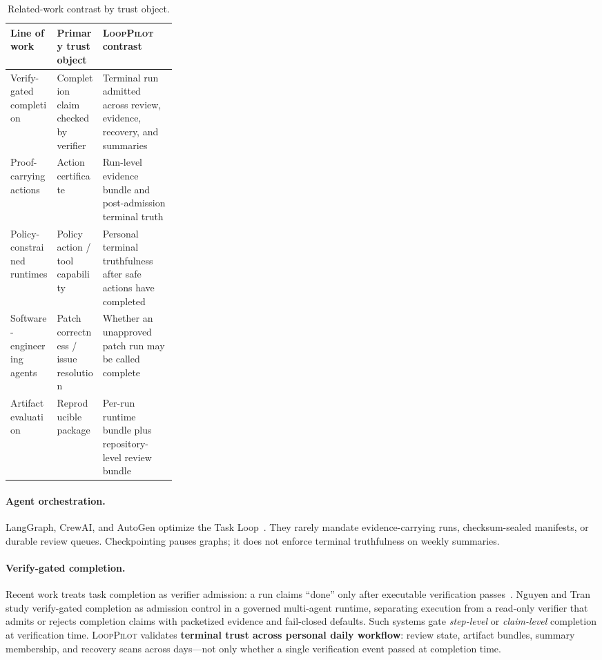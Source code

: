 \documentclass[11pt]{article}
\newcommand{\looppilot}{\textsc{LoopPilot}}
\begin{document}
\begin{table}[t]
  \centering
  \caption{Related-work contrast by trust object.}
  \label{tab:related-trust-objects}
  \small
  \begin{tabularx}{\linewidth}{@{}p{0.28\linewidth} X X@{}}
    \toprule
    \textbf{Line of work} & \textbf{Primary trust object} & \textbf{\looppilot{} contrast} \\
    \midrule
    Verify-gated completion & Completion claim checked by verifier & Terminal run admitted across review, evidence, recovery, and summaries \\
    Proof-carrying actions & Action certificate & Run-level evidence bundle and post-admission terminal truth \\
    Policy-constrained runtimes & Policy action / tool capability & Personal terminal truthfulness after safe actions have completed \\
    Software-engineering agents & Patch correctness / issue resolution & Whether an unapproved patch run may be called complete \\
    Artifact evaluation & Reproducible package & Per-run runtime bundle plus repository-level review bundle \\
    \bottomrule
  \end{tabularx}
\end{table}

\paragraph{Agent orchestration.}
LangGraph, CrewAI, and AutoGen optimize the Task Loop~\cite{langgraph2024,crewai2024,autogen2023}.
They rarely mandate evidence-carrying runs, checksum-sealed manifests, or durable review queues.
Checkpointing pauses graphs; it does not enforce terminal truthfulness on weekly summaries.

\paragraph{Verify-gated completion.}
Recent work treats task completion as verifier admission: a run claims ``done'' only after executable verification passes~\cite{nguyen2026verifygated}.
Nguyen and Tran study verify-gated completion as admission control in a governed multi-agent runtime, separating execution from a read-only verifier that admits or rejects completion claims with packetized evidence and fail-closed defaults.
Such systems gate \emph{step-level} or \emph{claim-level} completion at verification time.
\looppilot{} validates \textbf{terminal trust across personal daily workflow}: review state, artifact bundles, summary membership, and recovery scans across days---not only whether a single verification event passed at completion time.
\end{document}
